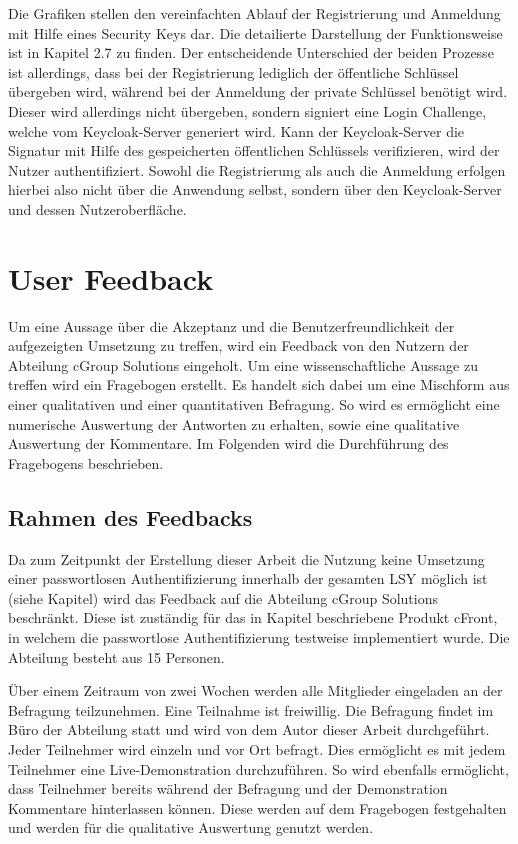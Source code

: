 Die Grafiken stellen den vereinfachten Ablauf der Registrierung und Anmeldung mit Hilfe eines Security Keys dar. Die detailierte Darstellung der Funktionsweise ist in Kapitel 2.7 zu finden. Der entscheidende Unterschied der beiden Prozesse ist allerdings, dass bei der Registrierung lediglich der öffentliche Schlüssel übergeben wird, während bei der Anmeldung der private Schlüssel benötigt wird. Dieser wird allerdings nicht übergeben, sondern signiert eine Login Challenge, welche vom Keycloak-Server generiert wird. Kann der Keycloak-Server die Signatur mit Hilfe des gespeicherten öffentlichen Schlüssels verifizieren, wird der Nutzer authentifiziert. Sowohl die Registrierung als auch die Anmeldung erfolgen hierbei also nicht über die Anwendung selbst, sondern über den Keycloak-Server und dessen Nutzeroberfläche.

\section{User Feedback}
Um eine Aussage über die Akzeptanz und die Benutzerfreundlichkeit der aufgezeigten Umsetzung zu treffen, wird ein Feedback von den Nutzern der Abteilung cGroup Solutions eingeholt. Um eine wissenschaftliche Aussage zu treffen wird ein Fragebogen erstellt. Es handelt sich dabei um eine Mischform aus einer qualitativen und einer quantitativen Befragung. So wird es ermöglicht eine numerische Auswertung der Antworten zu erhalten, sowie eine qualitative Auswertung der Kommentare. Im Folgenden wird die Durchführung des Fragebogens beschrieben.

\subsection{Rahmen des Feedbacks}
Da zum Zeitpunkt der Erstellung dieser Arbeit die Nutzung keine Umsetzung einer passwortlosen Authentifizierung innerhalb der gesamten \ac{LSY} möglich ist (siehe Kapitel) wird das Feedback auf die Abteilung cGroup Solutions beschränkt. Diese ist zuständig für das in Kapitel beschriebene Produkt cFront, in welchem die passwortlose Authentifizierung testweise implementiert wurde. Die Abteilung besteht aus 15 Personen.

Über einem Zeitraum von zwei Wochen werden alle Mitglieder eingeladen an der Befragung teilzunehmen. Eine Teilnahme ist freiwillig. Die Befragung findet im Büro der Abteilung statt und wird von dem Autor dieser Arbeit durchgeführt. Jeder Teilnehmer wird einzeln und vor Ort befragt. Dies ermöglicht es mit jedem Teilnehmer eine Live-Demonstration durchzuführen. So wird ebenfalls ermöglicht, dass Teilnehmer bereits während der Befragung und der Demonstration Kommentare hinterlassen können. Diese werden auf dem Fragebogen festgehalten und werden für die qualitative Auswertung genutzt werden.

